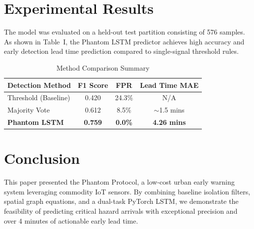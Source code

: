 \documentclass[conference]{IEEEtran}
\begin{document}
\section{Experimental Results}
The model was evaluated on a held-out test partition consisting of 576 samples. As shown in Table~I, the Phantom LSTM predictor achieves high accuracy and early detection lead time prediction compared to single-signal threshold rules.

\begin{table}[htbp]
\caption{Method Comparison Summary}
\begin{center}
\begin{tabular}{|l|c|c|c|}
\hline
\textbf{Detection Method} & \textbf{F1 Score} & \textbf{FPR} & \textbf{Lead Time MAE} \\
\hline
Threshold (Baseline) & 0.420 & 24.3\% & N/A \\
Majority Vote & 0.612 & 8.5\% & $\sim$1.5 mins \\
\textbf{Phantom LSTM} & \textbf{0.759} & \textbf{0.0\%} & \textbf{4.26 mins} \\
\hline
\end{tabular}
\end{center}
\end{table}

\section{Conclusion}
This paper presented the Phantom Protocol, a low-cost urban early warning system leveraging commodity IoT sensors. By combining baseline isolation filters, spatial graph equations, and a dual-task PyTorch LSTM, we demonstrate the feasibility of predicting critical hazard arrivals with exceptional precision and over 4 minutes of actionable early lead time.



\end{document}
